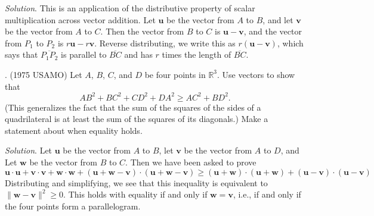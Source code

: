 \documentclass[11pt]{article}
\theoremstyle{definition}
\newcounter{prob}
\newcommand\itm{\theprob.  \stepcounter{prob}}
\newcommand\sol[2]{\textit{Solution}. #1}
\newcommand\sol[2]{#2}
\begin{document}
\sol{
This is an application of the distributive property of scalar multiplication across vector addition. Let $\mathbf{u}$ be the vector from $A$ to $B$, and let $\mathbf{v}$ be the vector from $A$ to $C$. Then the vector from $B$ to $C$ is $\mathbf{u}-\mathbf{v}$, and the vector from $P_1$ to $P_2$ is $r \mathbf{u}-r \mathbf{v}$. Reverse distributing, we write this as $r(\mathbf{u}-\mathbf{v})$, which says that $\overline{P_1P_2}$ is parallel to $\overline{BC}$ and has $r$ times the length of $\overline{BC}$. 
}{
\vfill
}

\itm (1975 USAMO) Let $A$, $B$, $C$, and $D$ be four points in $\mathbb{R}^3$. Use vectors to show that 
\[
AB^2 +BC^2 + CD^2 + DA^2 \geq AC^2 + BD^2. 
\]
(This generalizes the fact that the sum of the squares of the sides of a quadrilateral is at least the sum of the squares of its diagonals.) Make a statement about when equality holds. 

\sol{
Let $\mathbf{u}$ be the vector from $A$ to $B$, let $\mathbf{v}$ be the vector from $A$ to $D$, and Let $\mathbf{w}$ be the vector from $B$ to $C$. Then we have been asked to prove 
\[
\mathbf{u}\cdot \mathbf{u} + \mathbf{v}\cdot \mathbf{v} + \mathbf{w}\cdot \mathbf{w} + (\mathbf{u}+\mathbf{w}-\mathbf{v})\cdot (\mathbf{u}+\mathbf{w}-\mathbf{v}) \geq (\mathbf{u}+\mathbf{w})\cdot (\mathbf{u}+\mathbf{w}) + (\mathbf{u}-\mathbf{v})\cdot (\mathbf{u}-\mathbf{v})
\]
Distributing and simplifying, we see that this inequality is equivalent to $\|\mathbf{w}-\mathbf{v}\|^2 \geq 0$. This holds with equality if and only if $\mathbf{w}=\mathbf{v}$, i.e., if and only if the four points form a parallelogram. 
}{
\vfill
}


\end{document}
